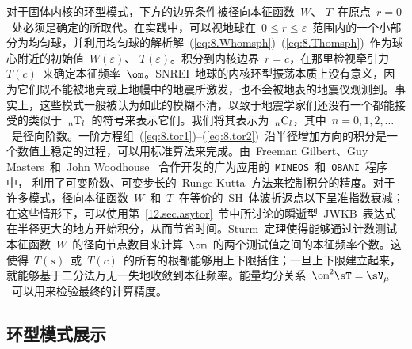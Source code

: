 对于固体内核的环型模式，下方的边界条件被径向本征函数~$W$、 $T$~在原点~$r=0$~处必须是确定的所取代。在实践中，可以视地球在~$0\leq r\leq\varepsilon$~范围内的一个小部分为均匀球，并利用均匀球的解析解~(\ref{eq:8.Whomsph})--(\ref{eq:8.Thomsph})~作为球心附近的初始值~$W(\varepsilon)$、 $T(\varepsilon)$。积分到内核边界~$r=c$，在那里检视牵引力~$T(c)$~来确定本征频率~$\om$。SNREI~地球的内核环型振荡本质上没有意义，因为它们既不能被地壳或上地幔中的地震所激发，也不会被地表的地震仪观测到。事实上，这些模式一般被认为如此的模糊不清，以致于地震学家们还没有一个都能接受的类似于~${}_n{\rm T}_l$~的符号来表示它们。我们将其表示为~${}_n{\rm C}_l$，其中~$n=0,1,2,\ldots$~是径向阶数。一阶方程组~(\ref{eq:8.tor1})--(\ref{eq:8.tor2})~沿半径增加方向的积分是一个数值上稳定的过程，可以用标准算法来完成。由~Freeman Gilbert、Guy Masters~和~John Woodhouse~
合作开发的广为应用的~{\tt MINEOS\/}~和~{\tt OBANI\/}~程序中，
%
%
利用了可变阶数、可变步长的~Runge-Kutta~方法来控制积分的精度。对于许多模式，径向本征函数~$W$~和~$T$~在等价的~SH~体波折返点以下呈准指数衰减；在这些情形下，可以使用第~\ref{12.sec.asytor}~节中所讨论的瞬逝型~JWKB~表达式在半径更大的地方开始积分，从而节省时间。Sturm~定理使得能够通过计数测试本征函数~$W$~的径向节点数目来计算~$\om$~的两个测试值之间的本征频率个数。这使得~$T(s)$~或~$T(c)$~的所有的根都能够用上下限括住；一旦上下限建立起来，就能够基于二分法万无一失地收敛到本征频率。能量均分关系~$\om^2\sT=\sV_{\mu}$~可以用来检验最终的计算精度。
%

\subsection{环型模式展示}
\label{sec:8.torfigs}

